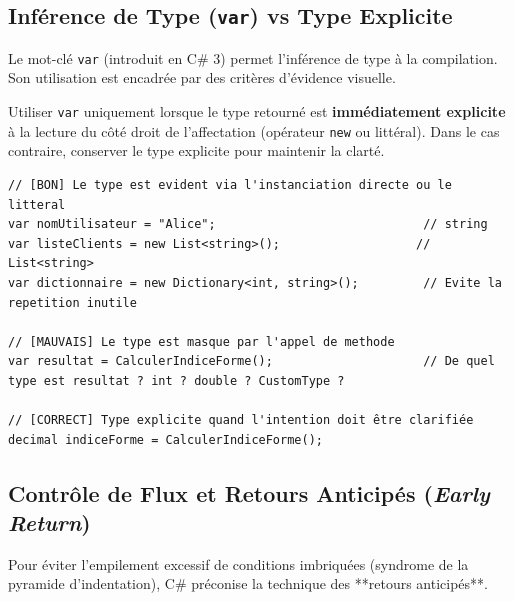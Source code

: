 \subsection{Inférence de Type (\texttt{var}) vs Type Explicite}

Le mot-clé \texttt{var} (introduit en C\# 3) permet l'inférence de type à la compilation. Son utilisation est encadrée par des critères d'évidence visuelle.

\begin{tcolorbox}[colback=white,colframe=keywordcolor,title=\textbf{Règle d'or de l'inférence \texttt{var}}]
    Utiliser \texttt{var} uniquement lorsque le type retourné est \textbf{immédiatement explicite} à la lecture du côté droit de l'affectation (opérateur \texttt{new} ou littéral). Dans le cas contraire, conserver le type explicite pour maintenir la clarté.
\end{tcolorbox}

\begin{lstlisting}[caption={Usage correct et incorrect de var}]
// [BON] Le type est evident via l'instanciation directe ou le litteral
var nomUtilisateur = "Alice";                             // string
var listeClients = new List<string>();                   // List<string>
var dictionnaire = new Dictionary<int, string>();         // Evite la repetition inutile

// [MAUVAIS] Le type est masque par l'appel de methode
var resultat = CalculerIndiceForme();                     // De quel type est resultat ? int ? double ? CustomType ?

// [CORRECT] Type explicite quand l'intention doit être clarifiée
decimal indiceForme = CalculerIndiceForme();
\end{lstlisting}



\subsection{Contrôle de Flux et Retours Anticipés (\emph{Early Return})}

Pour éviter l'empilement excessif de conditions imbriquées (syndrome de la pyramide d'indentation), C\# préconise la technique des **retours anticipés**.


